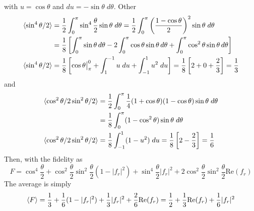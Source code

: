 \documentclass[../../../main.tex]{subfiles}
\begin{document}
with $u = \cos\theta$ and $du = -\sin \theta \;d\theta$.
Other
\begin{align*}
  \braket{\sin^4 \theta/2 }
   & = \frac{1 }{2 } \int_{0 }^{\pi} \sin^4 \frac{\theta }{2} \sin \theta\;d\theta
  = \frac{1 }{2 } \int_{0 }^{\pi} \left( \frac{1 - \cos \theta }{2} \right)^2  \sin \theta\;d\theta                                                                     \\
   & = \frac{1}{8}\left[\int_0^\pi \sin\theta\,d\theta - 2\int_0^\pi \cos\theta\sin\theta\,d\theta + \int_0^\pi \cos^2\theta\sin\theta\,d\theta\right]                  \\
  \braket{\sin^4 \theta/2 }
   & = \frac{1}{8} \left[ \cos \theta\big|_\pi^0 + \int_{1 }^{-1 }u\;du + \int_{-1 }^{1 }u^2\;du\right]  = \frac{1 }{8 }\left[ 2+0+\frac{2 }{3} \right]  = \frac{1 }{3}
\end{align*}
and
\begin{align*}
  \braket{\cos ^2\theta/2\sin^2 \theta/2 }
   & =  \frac{1 }{2 }\int_{0 }^{\pi }\frac{1}{4 }(1+\cos \theta)(1-\cos \theta)\sin \theta\;d\theta          \\
   & =  \frac{1 }{8 }\int_{0 }^{\pi }(1-\cos^2 \theta)\sin \theta\;d\theta                                   \\
  \braket{\cos ^2\theta/2\sin^2 \theta/2 }
   & =  \frac{1 }{8 }\int_{-1 }^{1 }(1-u^2)\;du = \frac{1 }{8 }\left[ 2- \frac{2 }{3}\right]  = \frac{1 }{6} \\
\end{align*}
Then, with the fidelity as
\begin{equation*}
  F =     \cos^4 \frac{\theta}{2 } + \cos^2\frac{\theta}{2 }\sin ^2\frac{\theta}{2 } (1-|f_r|^2 ) + \sin ^4\frac{\theta}{2 } |f_r|^2 + 2\cos^2\frac{\theta}{2 }\sin ^2\frac{\theta}{2 } \mathrm{Re}(f_r)
\end{equation*}
The average is simply
\begin{equation*}
  \braket{F } = \frac{1 }{3 } + \frac{1 }{6} (1-|f_r|^2 ) + \frac{1 }{3 }|f_r|^2 + \frac{2 }{6 }\mathrm{Re }(f_r) = \frac{1 }{2 } + \frac{1 }{3} \mathrm{Re} (f_r) +\frac{1 }{6 }|f_r|^2
\end{equation*}
\end{document}
